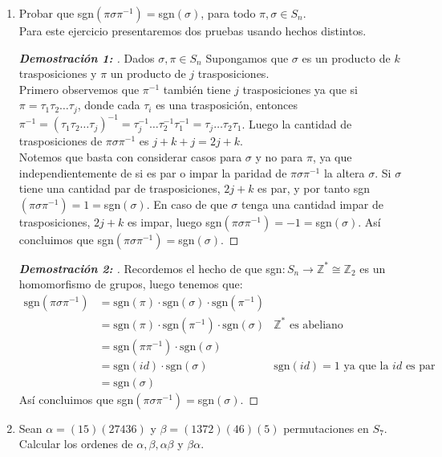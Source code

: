 \documentclass[12pt]{article}
\begin{document}
\begin{enumerate}
\begin{proof}[\textbf{Solución: }]
$$\begin{matrix}
    \end{matrix}$$
    \end{proof}
    \item Probar que sgn$(\pi\sigma\pi^{-1})=$sgn$(\sigma)$, para todo $\pi,\sigma\in S_n$.\\
    Para este ejercicio presentaremos dos pruebas usando hechos distintos.
    \begin{proof}[\textbf{Demostración 1: }] Dados $\sigma,\pi\in S_n$ Supongamos que $\sigma$ es un producto de $k$ trasposiciones y $\pi$ un producto de $j$ trasposiciones.\\
    Primero observemos que $\pi^{-1}$ también tiene $j$ trasposiciones ya que si $\pi=\tau_1\tau_2\dots\tau_j$, donde cada $\tau_i$ es una trasposición, entonces $\pi^{-1}=(\tau_1\tau_2\dots\tau_j)^{-1}=\tau_j^{-1}\dots\tau_2^{-1}\tau_1^{-1}=\tau_j\dots\tau_2\tau_1$. Luego la cantidad de trasposiciones de $\pi\sigma\pi^{-1}$ es $j+k+j=2j+k$.\\
    Notemos que basta con considerar casos para $\sigma$ y no para $\pi$, ya que independientemente de si es par o impar la paridad de $\pi\sigma\pi^{-1}$ la altera $\sigma$. Si $\sigma$ tiene una cantidad par de trasposiciones, $2j+k$ es par, y por tanto sgn$(\pi\sigma\pi^{-1})=1=$sgn$(\sigma)$. En caso de que $\sigma$ tenga una cantidad impar de trasposiciones, $2j+k$ es impar, luego sgn$(\pi\sigma\pi^{-1})=-1=$sgn$(\sigma)$. Así concluimos que sgn$(\pi\sigma\pi^{-1})=$sgn$(\sigma)$.  
    \end{proof}
    \begin{proof}[\textbf{Demostración 2: }]Recordemos el hecho de que sgn$:S_n\to\mathbb{Z}^*\cong\mathbb{Z}_2$ es un homomorfismo de grupos, luego tenemos que:
    \begin{align*}
        \text{sgn}(\pi\sigma\pi^{-1})&=\text{sgn}(\pi)\cdot\text{sgn}(\sigma)\cdot\text{sgn}(\pi^{-1})&\\
        &=\text{sgn}(\pi)\cdot\text{sgn}(\pi^{-1})\cdot\text{sgn}(\sigma)&\mathbb{Z}^*\text{ es abeliano}\\
        &=\text{sgn}(\pi\pi^{-1})\cdot\text{sgn}(\sigma)\\
        &=\text{sgn}(id)\cdot\text{sgn}(\sigma)&\text{sgn}(id)=1\text{ ya que la $id$ es par}\\
        &=\text{sgn}(\sigma)
    \end{align*}
        Así concluimos que sgn$(\pi\sigma\pi^{-1})=$sgn$(\sigma)$.  
    \end{proof}
    \item Sean $\alpha=(15)(27436)$ y $\beta=(1372)(46)(5)$ permutaciones en $S_7$. Calcular los ordenes de $\alpha,\beta,\alpha\beta$ y $\beta\alpha$.

\end{enumerate}
\end{document}
